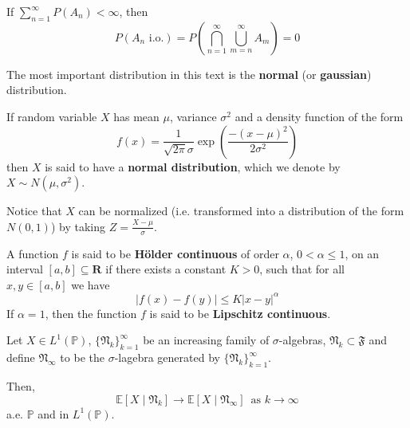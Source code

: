 \begin{lemma}
	If $\sum_{n=1}^\infty P(A_n) < \infty$, then
	\[
		P(A_n \text{ i.o.}) = P \left( \bigcap_{n=1}^\infty \bigcup_{m=n}^\infty A_m \right) = 0
	\]
\end{lemma}


The most important distribution in this text is the \textbf{normal} (or \textbf{gaussian}) distribution.
 
\begin{definition}
	If random variable $X$ has mean $\mu$, variance $\sigma^2$ and a density function of the form
	\[
		f(x) = \frac{1}{\sqrt{2\pi} \sigma} \exp \left( \frac{-(x-\mu)^2}{2\sigma^2} \right) 
	\]
	then $X$ is said to have a \textbf{normal distribution}, which we denote by $X \sim N(\mu, \sigma^2)$.
\end{definition}

Notice that $X$ can be normalized (i.e. transformed into a distribution of the form $N(0,1)$) by taking $Z = \frac{X-\mu}{\sigma}$.


\begin{definition}
	A function $f$ is said to be \textbf{H\"older continuous} of order $\alpha$, $0 < \alpha \leq 1$, on an interval $[a,b] \subseteq \textbf{R}$ if there exists a constant $K > 0$, such that for all $x,y \in [a,b]$ we have
	\[
		|f(x) - f(y)| \leq K |x-y|^{\alpha}
	\]
	If $\alpha = 1$, then the function $f$ is said to be \textbf{Lipschitz continuous}.
\end{definition}

\begin{corollary}%
	Let $X \in L^1(\mathbb{P})$, $\{ \mathfrak{N}_k \}_{k=1}^\infty$ be an increasing family of $\sigma$-algebras, $\mathfrak{N}_k \subset \mathfrak{F}$ and define $\mathfrak{N}_\infty$ to be the $\sigma$-lagebra generated by $\{ \mathfrak{N}_k \}_{k=1}^\infty$.

	Then,
	\begin{equation*}
		\mathbb{E}[X  \mid  \mathfrak{N}_k] \longrightarrow \mathbb{E}[X  \mid  \mathfrak{N}_\infty] \, \text{ as } k \to \infty
	\end{equation*}
	a.e. $\mathbb{P}$ and in $L^1(\mathbb{P})$.
\end{corollary}

